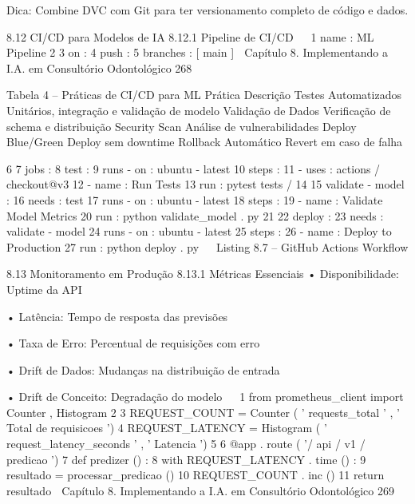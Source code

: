       Dica: Combine DVC com Git para ter versionamento completo de código e dados.


  8.12       CI/CD para Modelos de IA
  8.12.1      Pipeline de CI/CD
                                                                                         
1 name : ML Pipeline
2
3 on :
4    push :
5      branches : [ main ]
     Capítulo 8. Implementando a I.A. em Consultório Odontológico                        268


                               Tabela 4 – Práticas de CI/CD para ML
                  Prática                  Descrição
                  Testes Automatizados     Unitários, integração e validação de modelo
                  Validação de Dados       Verificação de schema e distribuição
                  Security Scan            Análise de vulnerabilidades
                  Deploy Blue/Green        Deploy sem downtime
                  Rollback Automático      Revert em caso de falha


 6
 7 jobs :
 8   test :
 9      runs - on : ubuntu - latest
10      steps :
11        - uses : actions / checkout@v3
12        - name : Run Tests
13           run : pytest tests /
14
15   validate - model :
16      needs : test
17      runs - on : ubuntu - latest
18      steps :
19        - name : Validate Model Metrics
20           run : python validate_model . py
21
22   deploy :
23      needs : validate - model
24      runs - on : ubuntu - latest
25      steps :
26        - name : Deploy to Production
27           run : python deploy . py
                                                                                              
                                Listing 8.7 – GitHub Actions Workflow



     8.13      Monitoramento em Produção
     8.13.1     Métricas Essenciais
         • Disponibilidade: Uptime da API

         • Latência: Tempo de resposta das previsões

         • Taxa de Erro: Percentual de requisições com erro

         • Drift de Dados: Mudanças na distribuição de entrada

         • Drift de Conceito: Degradação do modelo
                                                                                              
 1   from prometheus_client import Counter , Histogram
 2
 3   REQUEST_COUNT = Counter ( ' requests_total ' , ' Total de requisicoes ')
 4   REQUEST_LATENCY = Histogram ( ' request_latency_seconds ' , ' Latencia ')
 5
 6   @app . route ( '/ api / v1 / predicao ')
 7   def predizer () :
 8        with REQUEST_LATENCY . time () :
 9             resultado = processar_predicao ()
10             REQUEST_COUNT . inc ()
11             return resultado
     Capítulo 8. Implementando a I.A. em Consultório Odontológico                  269




